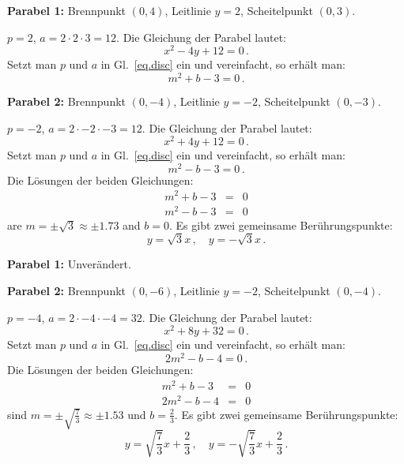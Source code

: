 \begin{example}\mbox{}

\noindent\textbf{Parabel 1:} Brennpunkt $(0,4)$, Leitlinie $y=2$, Scheitelpunkt $(0,3)$.

\noindent{}$p=2$, $a=2\cdot 2\cdot 3=12$. Die Gleichung der Parabel lautet:
\[
x^2-4y +12=0\,.
\]
Setzt man $p$ und $a$ in Gl.~\ref{eq.disc} ein und vereinfacht, so erhält man:
\[
m^2+b-3=0\,.
\]

\noindent\textbf{Parabel 2:} Brennpunkt $(0,-4)$, Leitlinie $y=-2$, Scheitelpunkt $(0,-3)$.

\noindent{}$p=-2$, $a=2\cdot -2\cdot -3=12$. Die Gleichung der Parabel lautet:
\[
x^2+4y+12=0\,.
\]
Setzt man $p$ und $a$ in Gl.~\ref{eq.disc} ein und vereinfacht, so erhält man:
\[
m^2-b-3=0\,.
\]
Die Lösungen der beiden Gleichungen:
\begin{eqnarray*}
m^2+b-3&=&0\\
m^2-b-3&=&0
\end{eqnarray*}
are $m=\pm\sqrt{3}\approx \pm 1.73$ and $b=0$. Es gibt zwei gemeinsame Berührungspunkte:
\[
y=\sqrt{3}x\,,\quad y=-\sqrt{3}x\,.
\]
\end{example}

\begin{example}\mbox{}

\noindent\textbf{Parabel 1:}
Unverändert.

\noindent\textbf{Parabel 2:} Brennpunkt $(0,-6)$, Leitlinie $y=-2$, Scheitelpunkt $(0,-4)$.

\noindent{}$p=-4$, $a=2\cdot -4\cdot -4=32$. Die Gleichung der Parabel lautet:
\[
x^2+8y +32=0\,.
\]
Setzt man $p$ und $a$ in Gl.~\ref{eq.disc} ein und vereinfacht, so erhält man:
\[
2m^2-b-4=0\,.
\]
Die Lösungen der beiden Gleichungen:
\begin{eqnarray*}
m^2+b-3&=&0\\
2m^2-b-4&=&0
\end{eqnarray*}
sind $m=\pm\sqrt{\displaystyle\frac{7}{3}}\approx \pm 1.53$ und $b=\displaystyle\frac{2}{3}$. Es gibt zwei gemeinsame Berührungspunkte:
\[
y=\sqrt{\frac{7}{3}}x+\frac{2}{3}\,,\quad y=-\sqrt{\frac{7}{3}}x+\frac{2}{3}\,.
\]
\end{example}


